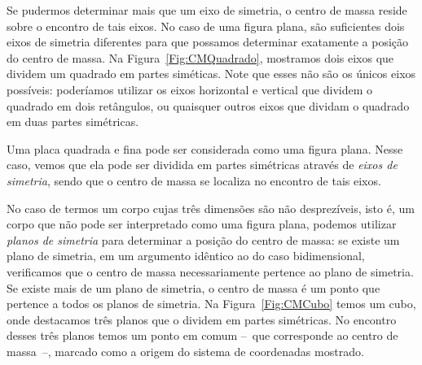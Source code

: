 Se pudermos determinar mais que um eixo de simetria, o centro de massa reside sobre o encontro de tais eixos. No caso de uma figura plana, são suficientes dois eixos de simetria diferentes para que possamos determinar exatamente a posição do centro de massa. Na Figura~\ref{Fig:CMQuadrado}, mostramos dois eixos que dividem um quadrado em partes siméticas. Note que esses não são os únicos eixos possíveis: poderíamos utilizar os eixos horizontal e vertical que dividem o quadrado em dois retângulos, ou quaisquer outros eixos que dividam o quadrado em duas partes simétricas.
\begin{marginfigure}[-2cm]
\centering
{}
\caption{Uma placa quadrada e fina pode ser considerada como uma figura plana. Nesse caso, vemos que ela pode ser dividida em partes simétricas através de \emph{eixos de simetria}, sendo que o centro de massa se localiza no encontro de tais eixos. \label{Fig:CMQuadrado}}
\end{marginfigure}


No caso de termos um corpo cujas três dimensões são não desprezíveis, isto é, um corpo que não pode ser interpretado como uma figura plana, podemos utilizar \emph{planos de simetria} para determinar a posição do centro de massa: se existe um plano de simetria, em um argumento idêntico ao do caso bidimensional, verificamos que o centro de massa necessariamente pertence ao plano de simetria. Se existe mais de um plano de simetria, o centro de massa é um ponto que pertence a todos os planos de simetria. Na Figura~\ref{Fig:CMCubo} temos um cubo, onde destacamos três planos que o dividem em partes simétricas. No encontro desses três planos temos um ponto em comum --~que corresponde ao centro de massa~--, marcado como a origem do sistema de coordenadas mostrado. 

